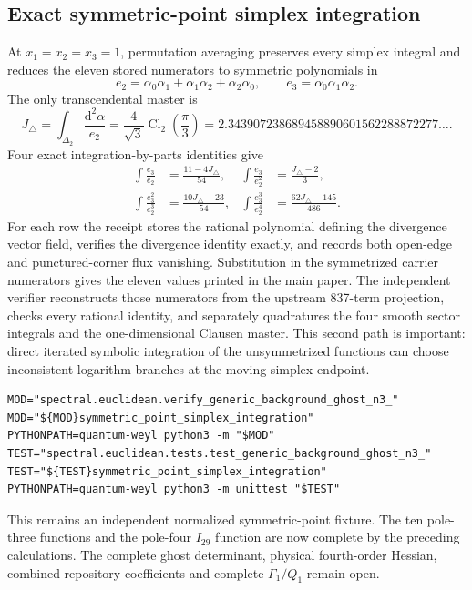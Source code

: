 \documentclass[11pt]{article}
\theoremstyle{definition}
\theoremstyle{remark}
\newcommand{\dd}{\mathrm d}
\begin{document}
\subsection{Exact symmetric-point simplex integration}

At $x_1=x_2=x_3=1$, permutation averaging preserves every simplex integral
and reduces the eleven stored numerators to symmetric polynomials in
\[
 e_2=\alpha_0\alpha_1+\alpha_1\alpha_2+\alpha_2\alpha_0,
 \qquad e_3=\alpha_0\alpha_1\alpha_2.
\]
The only transcendental master is
\[
 J_\triangle=\int_{\Delta_2}\frac{\dd^2\alpha}{e_2}
 =\frac4{\sqrt3}\operatorname{Cl}_2\!\left(\frac\pi3\right)
 =2.343907238689458890601562288872277\ldots .
\]
Four exact integration-by-parts identities give
\[
\begin{aligned}
 \int\frac{e_3}{e_2}&=\frac{11-4J_\triangle}{54},&
 \int\frac{e_3}{e_2^2}&=\frac{J_\triangle-2}{3},\\
 \int\frac{e_3^2}{e_2^3}&=\frac{10J_\triangle-23}{54},&
 \int\frac{e_3^3}{e_2^4}&=\frac{62J_\triangle-145}{486}.
\end{aligned}
\]
For each row the receipt stores the rational polynomial defining the
divergence vector field, verifies the divergence identity exactly, and
records both open-edge and punctured-corner flux vanishing.  Substitution in
the symmetrized carrier numerators gives the eleven values printed in the
main paper.  The independent verifier reconstructs those numerators from the
upstream 837-term projection, checks every rational identity, and separately
quadratures the four smooth sector integrals and the one-dimensional Clausen
master.  This second path is important: direct iterated symbolic integration
of the unsymmetrized functions can choose inconsistent logarithm branches at
the moving simplex endpoint.

\begin{verbatim}
MOD="spectral.euclidean.verify_generic_background_ghost_n3_"
MOD="${MOD}symmetric_point_simplex_integration"
PYTHONPATH=quantum-weyl python3 -m "$MOD"
TEST="spectral.euclidean.tests.test_generic_background_ghost_n3_"
TEST="${TEST}symmetric_point_simplex_integration"
PYTHONPATH=quantum-weyl python3 -m unittest "$TEST"
\end{verbatim}

This remains an independent normalized symmetric-point fixture.  The ten
pole-three functions and the pole-four $I_{29}$ function are now complete by
the preceding calculations.  The complete ghost determinant, physical
fourth-order Hessian, combined repository coefficients and complete
$\Gamma_1/Q_1$ remain open.
\end{document}
